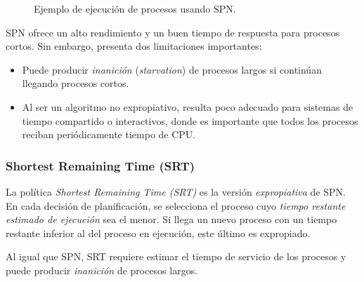 \begin{figure}[!ht]
  \centering
  \caption{Ejemplo de ejecución de procesos usando SPN.}
\end{figure}

SPN ofrece un alto rendimiento y un buen tiempo de respuesta para procesos cortos. Sin embargo, presenta dos limitaciones importantes:
\begin{itemize}
  \item Puede producir \textit{inanición} (\textit{starvation}) de procesos largos si continúan llegando procesos cortos.
  \item Al ser un algoritmo no expropiativo, resulta poco adecuado para sistemas de tiempo compartido o interactivos, donde es importante que todos los procesos reciban periódicamente tiempo de CPU.
\end{itemize}

\subsubsection{Shortest Remaining Time (SRT)}

La política \textit{Shortest Remaining Time (SRT)} es la versión \textit{expropiativa} de SPN. En cada decisión de planificación, se selecciona el proceso cuyo \textit{tiempo restante estimado de ejecución} sea el menor. Si llega un nuevo proceso con un tiempo restante inferior al del proceso en ejecución, este último es expropiado.

Al igual que SPN, SRT requiere estimar el tiempo de servicio de los procesos y puede producir \textit{inanición} de procesos largos.

